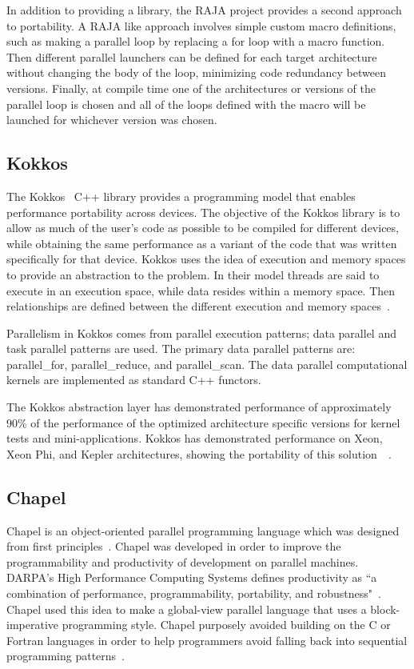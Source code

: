 In addition to providing a library, the RAJA project provides a second approach to portability.
%
A RAJA like approach involves simple custom macro definitions, such as making a parallel loop by replacing a for loop with a macro function.
%
Then different parallel launchers can be defined for each target architecture without changing the body of the loop, minimizing code redundancy between versions.
%
Finally, at compile time one of the architectures or versions of the parallel loop is chosen and all of the loops defined with the macro will be launched for whichever version was chosen.

\subsection*{\textbf{Kokkos}}

The Kokkos~\cite{edwards2012kokkos} C++ library provides a programming model that enables performance portability across devices.
%
The objective of the Kokkos library is to allow as much of the user's code as possible to be compiled for different devices, while obtaining the same performance as a variant of the code that was written specifically for that device.
%
Kokkos uses the idea of execution and memory spaces to provide an abstraction to the problem.
%
In their model threads are said to execute in an execution space, while data resides within a memory space.
%
Then relationships are defined between the different execution and memory spaces~\cite{edwards2014kokkos}.

Parallelism in Kokkos comes from parallel execution patterns; data parallel and task parallel patterns are used.
%
The primary data parallel patterns are: parallel\_for, parallel\_reduce, and parallel\_scan.
%
The data parallel computational kernels are implemented as standard C++ functors.
%

The Kokkos abstraction layer has demonstrated performance of approximately 90\% of the performance of the optimized architecture specific versions for kernel tests and mini-applications.
%
Kokkos has demonstrated performance on Xeon, Xeon Phi, and Kepler architectures, showing the portability of this solution~\cite{edwards2014kokkos}~\cite{edwards2012manycore}.

\subsection*{\textbf{Chapel}}

Chapel is an object-oriented parallel programming language which was designed from first principles~\cite{sidelnik2012performance}.
%
Chapel was developed in order to improve the programmability and productivity of development on parallel machines.
%
DARPA's High Performance Computing Systems defines productivity as ``a combination of performance, programmability, portability, and robustness"~\cite{chamberlain2007parallel}.
%
Chapel used this idea to make a global-view parallel language that uses a block-imperative programming style.
%
Chapel purposely avoided building on the C or Fortran languages in order to help programmers avoid falling back into sequential programming patterns~\cite{chamberlain2007parallel}.

